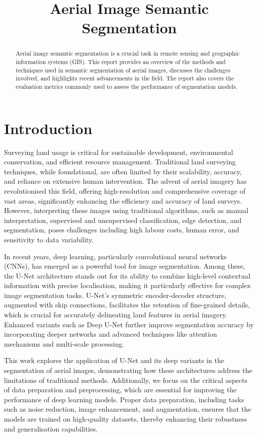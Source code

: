 \documentclass[conference]{IEEEtran}
\title{Aerial Image Semantic Segmentation}
\author{
    \IEEEauthorblockN{Chinatip Lawansuk}
    \IEEEauthorblockA{
        Department of Electrical Engineering and Computer Science\\
        National Taipei University of Technology\\
        Email: t112998405@ntut.edu.tw
    }
}
\begin{document}
\maketitle

\begin{abstract}
Aerial image semantic segmentation is a crucial task in remote sensing and geographic information systems (GIS). This report provides an overview of the methods and techniques used in semantic segmentation of aerial images, discusses the challenges involved, and highlights recent advancements in the field. The report also covers the evaluation metrics commonly used to assess the performance of segmentation models.
\end{abstract}


\section{Introduction}
Surveying land usage is critical for sustainable development, environmental conservation, and efficient resource management. Traditional land surveying techniques, while foundational, are often limited by their scalability, accuracy, and reliance on extensive human intervention. The advent of aerial imagery has revolutionised this field, offering high-resolution and comprehensive coverage of vast areas, significantly enhancing the efficiency and accuracy of land surveys. However, interpreting these images using traditional algorithms, such as manual interpretation, supervised and unsupervised classification, edge detection, and segmentation, poses challenges including high labour costs, human error, and sensitivity to data variability.

In recent years, deep learning, particularly convolutional neural networks (CNNs), has emerged as a powerful tool for image segmentation. Among these, the U-Net architecture stands out for its ability to combine high-level contextual information with precise localisation, making it particularly effective for complex image segmentation tasks. U-Net's symmetric encoder-decoder structure, augmented with skip connections, facilitates the retention of fine-grained details, which is crucial for accurately delineating land features in aerial imagery. Enhanced variants such as Deep U-Net further improve segmentation accuracy by incorporating deeper networks and advanced techniques like attention mechanisms and multi-scale processing.

This work explores the application of U-Net and its deep variants in the segmentation of aerial images, demonstrating how these architectures address the limitations of traditional methods. Additionally, we focus on the critical aspects of data preparation and preprocessing, which are essential for improving the performance of deep learning models. Proper data preparation, including tasks such as noise reduction, image enhancement, and augmentation, ensures that the models are trained on high-quality datasets, thereby enhancing their robustness and generalisation capabilities.
\end{document}
